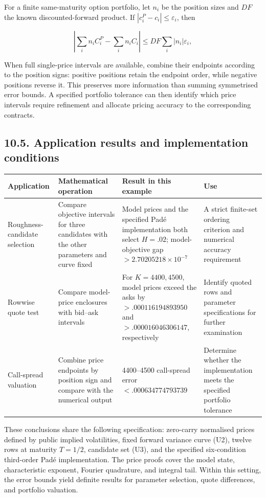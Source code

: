 \documentclass[a4paper,11pt]{article}
\begin{document}
For a finite same-maturity option portfolio, let $n_i$ be the position sizes and $DF$ the known discounted-forward product. If $|c_i^P-c_i|\le\varepsilon_i$, then

\[
\left|\sum_i n_i C_i^P-\sum_i n_i C_i\right|
\le DF\sum_i|n_i|\varepsilon_i,
\tag{U12}
\]

When full single-price intervals are available, combine their endpoints according to the position signs: positive positions retain the endpoint order, while negative positions reverse it. This preserves more information than summing symmetrised error bounds. A specified portfolio tolerance can then identify which price intervals require refinement and allocate pricing accuracy to the corresponding contracts.

\subsection*{10.5. Application results and implementation conditions}

\begingroup\scriptsize\setlength{\tabcolsep}{3pt}
\begin{longtable}{L{0.222500\textwidth}L{0.222500\textwidth}L{0.222500\textwidth}L{0.222500\textwidth}}
Application & Mathematical operation & Result in this example & Use\\
\hline
Roughness-candidate selection & Compare objective intervals for three candidates with the other parameters and curve fixed & Model prices and the specified Padé implementation both select $H=.02$; model-objective gap $>2.70205218\times10^{-7}$ & A strict finite-set ordering criterion and numerical accuracy requirement\\
Rowwise quote test & Compare model-price enclosures with bid–ask intervals & For $K=4400,4500$, model prices exceed the asks by $>.000116194893950$ and $>.000016046306147$, respectively & Identify quoted rows and parameter specifications for further examination\\
Call-spread valuation & Combine price endpoints by position sign and compare with the numerical output & 4400–4500 call-spread error $<.000634774793739$ & Determine whether the implementation meets the specified portfolio tolerance\\
\end{longtable}\endgroup

These conclusions share the following specification: zero-carry normalised prices defined by public implied volatilities, fixed forward variance curve (U2), twelve rows at maturity $T=1/2$, candidate set (U3), and the specified six-condition third-order Padé implementation. The price proofs cover the model state, characteristic exponent, Fourier quadrature, and integral tail. Within this setting, the error bounds yield definite results for parameter selection, quote differences, and portfolio valuation.
\end{document}
